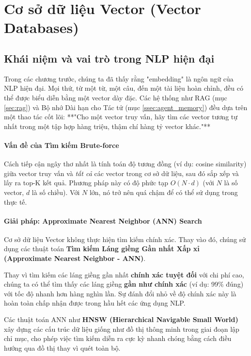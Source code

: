 
\section{Cơ sở dữ liệu Vector (Vector Databases)}
\label{sec:vector_databases}

\subsection{Khái niệm và vai trò trong NLP hiện đại}
\label{ssec:vector_db_concepts}

Trong các chương trước, chúng ta đã thấy rằng "embedding" là ngôn ngữ của NLP hiện đại. Mọi thứ, từ một từ, một câu, đến một tài liệu hoàn chỉnh, đều có thể được biểu diễn bằng một vector dày đặc. Các hệ thống như RAG (mục \ref{sec:rag}) và Bộ nhớ Dài hạn cho Tác tử (mục \ref{ssec:agent_memory}) đều dựa trên một thao tác cốt lõi: **"Cho một vector truy vấn, hãy tìm các vector tương tự nhất trong một tập hợp hàng triệu, thậm chí hàng tỷ vector khác."**

\paragraph{Vấn đề của Tìm kiếm Brute-force}
Cách tiếp cận ngây thơ nhất là tính toán độ tương đồng (ví dụ: cosine similarity) giữa vector truy vấn và \textit{tất cả} các vector trong cơ sở dữ liệu, sau đó sắp xếp và lấy ra top-K kết quả. Phương pháp này có độ phức tạp $O(N \cdot d)$ (với $N$ là số vector, $d$ là số chiều). Với $N$ lớn, nó trở nên quá chậm để có thể sử dụng trong thực tế.

\paragraph{Giải pháp: Approximate Nearest Neighbor (ANN) Search}
Cơ sở dữ liệu Vector không thực hiện tìm kiếm chính xác. Thay vào đó, chúng sử dụng các thuật toán \textbf{Tìm kiếm Láng giềng Gần nhất Xấp xỉ (Approximate Nearest Neighbor - ANN)}.
\begin{tcolorbox}[
    title=Triết lý của ANN,
    colback=yellow!10!white, colframe=yellow!50!black, fonttitle=\bfseries
]
Thay vì tìm kiếm các láng giềng gần nhất \textbf{chính xác tuyệt đối} với chi phí cao, chúng ta có thể tìm thấy các láng giềng \textbf{gần như chính xác} (ví dụ: 99\% đúng) với tốc độ nhanh hơn hàng nghìn lần. Sự đánh đổi nhỏ về độ chính xác này là hoàn toàn chấp nhận được trong hầu hết các ứng dụng NLP.
\end{tcolorbox}
Các thuật toán ANN như \textbf{HNSW (Hierarchical Navigable Small World)} xây dựng các cấu trúc dữ liệu giống như đồ thị thông minh trong giai đoạn lập chỉ mục, cho phép việc tìm kiếm diễn ra cực kỳ nhanh chóng bằng cách điều hướng qua đồ thị thay vì quét toàn bộ.

